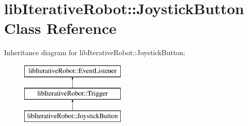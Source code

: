 \hypertarget{classlib_iterative_robot_1_1_joystick_button}{}\section{lib\+Iterative\+Robot\+::Joystick\+Button Class Reference}
\label{classlib_iterative_robot_1_1_joystick_button}
Inheritance diagram for lib\+Iterative\+Robot\+::Joystick\+Button\+:\begin{figure}[H]
\begin{center}
\leavevmode
\includegraphics[height=3.000000cm]{classlib_iterative_robot_1_1_joystick_button}
\end{center}
\end{figure}
